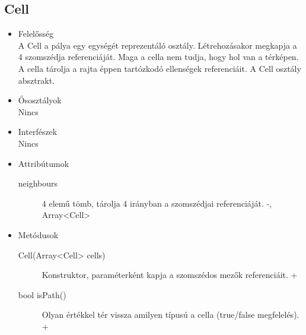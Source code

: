 \subsection{Cell}
\begin{itemize}
\item Felelősség\\
A Cell a pálya egy egységét reprezentáló osztály. Létrehozásakor megkapja a 4 szomszédja referenciáját. Maga a cella nem tudja, hogy hol van a térképen. A cella tárolja a rajta éppen tartózkodó ellenségek referenciáit. A Cell osztály absztrakt.
\item Ősosztályok\\
Nincs
\item Interfészek\\
Nincs
\item Attribútumok\\
	\begin{description}
		\item[neighbours] 4 elemű tömb, tárolja 4 irányban a szomszédjai referenciáját. -, Array<Cell> 

		
	\end{description}
\item Metódusok\\
	\begin{description}
		
		\item[Cell(Array<Cell> cells)] Konstruktor, paraméterként kapja a szomszédos mezők referenciáit. +
		\item[bool isPath()] Olyan értékkel tér vissza amilyen típusú a cella (true/false megfelelés). +
		
		
	\end{description}
\end{itemize}

